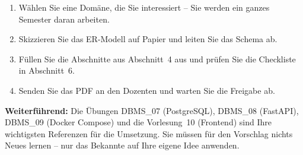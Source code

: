 \documentclass[11pt,a4paper]{article}
\begin{document}
\begin{enumerate}[leftmargin=1.6em]
  \item Wählen Sie eine Domäne, die Sie interessiert -- Sie werden ein ganzes
        Semester daran arbeiten.
  \item Skizzieren Sie das ER-Modell auf Papier und leiten Sie das Schema ab.
  \item Füllen Sie die Abschnitte aus Abschnitt~4 aus und prüfen Sie die
        Checkliste in Abschnitt~6.
  \item Senden Sie das PDF an den Dozenten und warten Sie die Freigabe ab.
\end{enumerate}

\vspace{1em}
\begin{infobox}
\textbf{Weiterführend:} Die Übungen DBMS\_07 (PostgreSQL), DBMS\_08 (FastAPI),
DBMS\_09 (Docker Compose) und die Vorlesung~10 (Frontend) sind Ihre wichtigsten
Referenzen für die Umsetzung. Sie müssen für den Vorschlag nichts Neues lernen
-- nur das Bekannte auf Ihre eigene Idee anwenden.
\end{infobox}
\end{document}
